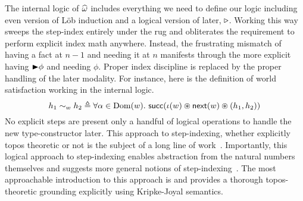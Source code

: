 The internal logic of $\widehat{\omega}$ includes everything we
need to define our logic including even version of L\"ob induction and
a logical version of later, ${\triangleright}$. Working this way sweeps the
step-index entirely under the rug and obliterates the requirement to
perform explicit index math anywhere. Instead, the frustrating
mismatch of having a fact at $n - 1$ and needing it at $n$ manifests
through the more explicit having ${\blacktriangleright} \phi$ and needing
$\phi$. Proper index discipline is replaced by the proper handling of
the later modality. For instance, here is the definition of world
satisfaction working in the internal logic.
\[
  h_1 \sim_w h_2 \triangleq
  \forall \alpha \in \operatorname{Dom}(w).
  \ \mathsf{succ}(\iota(w) \circledast \mathsf{next}(w) \circledast (h_1, h_2))
\]
No explicit steps are present only a handful of logical operations to
handle the new type-constructor later. This approach to step-indexing,
whether explicitly topos theoretic or not is the subject of a long
line of work~\citep{TODO-LOGICAL-STEPS}. Importantly, this logical
approach to step-indexing enables abstraction from the natural numbers
themselves and suggests more general notions of
step-indexing~\citep{Svendsen:16}. The most approachable introduction to
this approach is \citet{Dreyer:09} and \citet{Birkedal:steps:11} provides a
thorough topos-theoretic grounding explicitly using Kripke-Joyal
semantics.

